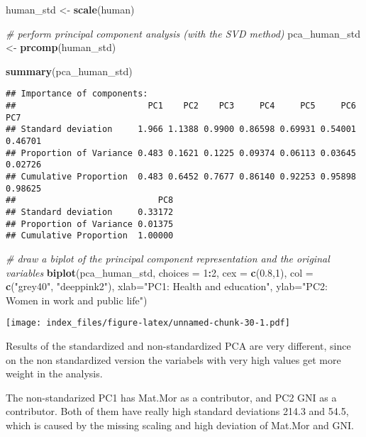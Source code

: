 \documentclass[]{article}
\newenvironment{Shaded}{\begin{snugshade}}{\end{snugshade}}
\newcommand{\KeywordTok}[1]{\textcolor[rgb]{0.13,0.29,0.53}{\textbf{#1}}}
\newcommand{\DataTypeTok}[1]{\textcolor[rgb]{0.13,0.29,0.53}{#1}}
\newcommand{\DecValTok}[1]{\textcolor[rgb]{0.00,0.00,0.81}{#1}}
\newcommand{\FloatTok}[1]{\textcolor[rgb]{0.00,0.00,0.81}{#1}}
\newcommand{\StringTok}[1]{\textcolor[rgb]{0.31,0.60,0.02}{#1}}
\newcommand{\CommentTok}[1]{\textcolor[rgb]{0.56,0.35,0.01}{\textit{#1}}}
\newcommand{\OperatorTok}[1]{\textcolor[rgb]{0.81,0.36,0.00}{\textbf{#1}}}
\newcommand{\NormalTok}[1]{#1}
\begin{document}
\begin{Shaded}
\begin{Highlighting}[]
\NormalTok{human_std <-}\StringTok{ }\KeywordTok{scale}\NormalTok{(human)}

\CommentTok{# perform principal component analysis (with the SVD method)}
\NormalTok{pca_human_std <-}\StringTok{ }\KeywordTok{prcomp}\NormalTok{(human_std)}

\KeywordTok{summary}\NormalTok{(pca_human_std)}
\end{Highlighting}
\end{Shaded}

\begin{verbatim}
## Importance of components:
##                          PC1    PC2    PC3     PC4     PC5     PC6     PC7
## Standard deviation     1.966 1.1388 0.9900 0.86598 0.69931 0.54001 0.46701
## Proportion of Variance 0.483 0.1621 0.1225 0.09374 0.06113 0.03645 0.02726
## Cumulative Proportion  0.483 0.6452 0.7677 0.86140 0.92253 0.95898 0.98625
##                            PC8
## Standard deviation     0.33172
## Proportion of Variance 0.01375
## Cumulative Proportion  1.00000
\end{verbatim}

\begin{Shaded}
\begin{Highlighting}[]
\CommentTok{# draw a biplot of the principal component representation and the original variables}
\KeywordTok{biplot}\NormalTok{(pca_human_std, }\DataTypeTok{choices =} \DecValTok{1}\OperatorTok{:}\DecValTok{2}\NormalTok{, }\DataTypeTok{cex =} \KeywordTok{c}\NormalTok{(}\FloatTok{0.8}\NormalTok{,}\DecValTok{1}\NormalTok{), }\DataTypeTok{col =} \KeywordTok{c}\NormalTok{(}\StringTok{"grey40"}\NormalTok{, }\StringTok{"deeppink2"}\NormalTok{), }\DataTypeTok{xlab=}\StringTok{"PC1: Health and education"}\NormalTok{, }\DataTypeTok{ylab=}\StringTok{"PC2: Women in work and public life"}\NormalTok{)}
\end{Highlighting}
\end{Shaded}

\texttt{[image: index\_files/figure-latex/unnamed-chunk-30-1.pdf]}

Results of the standardized and non-standardized PCA are very different,
since on the non standardized version the variabels with very high
values get more weight in the analysis.

The non-standarized PC1 has Mat.Mor as a contributor, and PC2 GNI as a
contributor. Both of them have really high standard deviations 214.3 and
54.5, which is caused by the missing scaling and high deviation of
Mat.Mor and GNI.
\end{document}

